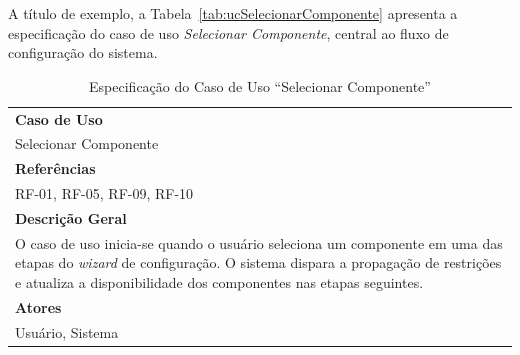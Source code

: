 A título de exemplo, a Tabela~\ref{tab:ucSelecionarComponente} apresenta a
especificação do caso de uso \textit{Selecionar Componente}, central ao fluxo de
configuração do sistema.

\FloatBarrier
\begin{table}[!htbp]
  \centering
  \caption{Especificação do Caso de Uso ``Selecionar Componente''}
  \begin{tabular}{ | p{15cm} | }
    \hline
    \textbf{Caso de Uso}                                                                                                                                                                                                                   \\
    Selecionar Componente                                                                                                                                                                                                                  \\	\hline
    \textbf{Referências}                                                                                                                                                                                                                   \\
    RF-01, RF-05, RF-09, RF-10                                                                                                                                                                                                             \\	\hline
    \textbf{Descrição Geral}                                                                                                                                                                                                               \\
    O caso de uso inicia-se quando o usuário seleciona um componente em uma das etapas do \textit{wizard} de configuração. O sistema dispara a propagação de restrições e atualiza a disponibilidade dos componentes nas etapas seguintes. \\	\hline
    \textbf{Atores}                                                                                                                                                                                                                        \\
    Usuário, Sistema                                                                                                                                                                                                                       \\	\hline

\end{tabular}
\end{table}
